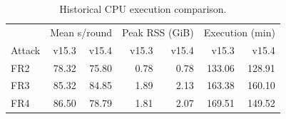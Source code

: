 \begin{table}[t]\centering\footnotesize
\caption{Historical CPU execution comparison.}\label{tab:historical-cost}
\begin{tabular}{lrrrrrr}\toprule
 & \multicolumn{2}{c}{Mean s/round} & \multicolumn{2}{c}{Peak RSS (GiB)} & \multicolumn{2}{c}{Execution (min)} \\
Attack & v15.3 & v15.4 & v15.3 & v15.4 & v15.3 & v15.4 \\ \midrule
FR2 & 78.32 & 75.80 & 0.78 & 0.78 & 133.06 & 128.91 \\
FR3 & 85.32 & 84.85 & 1.89 & 2.13 & 163.38 & 160.10 \\
FR4 & 86.50 & 78.79 & 1.81 & 2.07 & 169.51 & 149.52 \\
\bottomrule\end{tabular}
\end{table}
